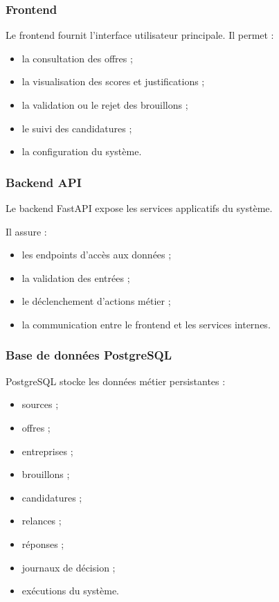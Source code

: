 \documentclass[11pt,a4paper]{article}
\begin{document}
\subsubsection{Frontend}

Le frontend fournit l’interface utilisateur principale. Il permet :

\begin{itemize}
    \item la consultation des offres ;
    \item la visualisation des scores et justifications ;
    \item la validation ou le rejet des brouillons ;
    \item le suivi des candidatures ;
    \item la configuration du système.
\end{itemize}

\subsubsection{Backend API}

Le backend FastAPI expose les services applicatifs du système.

Il assure :

\begin{itemize}
    \item les endpoints d’accès aux données ;
    \item la validation des entrées ;
    \item le déclenchement d’actions métier ;
    \item la communication entre le frontend et les services internes.
\end{itemize}

\subsubsection{Base de données PostgreSQL}

PostgreSQL stocke les données métier persistantes :

\begin{itemize}
    \item sources ;
    \item offres ;
    \item entreprises ;
    \item brouillons ;
    \item candidatures ;
    \item relances ;
    \item réponses ;
    \item journaux de décision ;
    \item exécutions du système.
\end{itemize}
\end{document}
